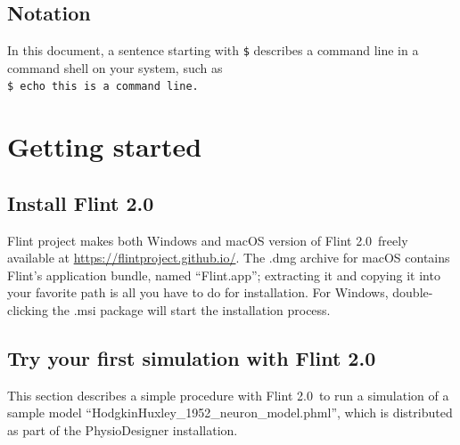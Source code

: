 \documentclass[a4paper,10pt]{report}
\def\FlintVersion{2.0}
\def\Flint{Flint \FlintVersion}
\begin{document}
\section{Notation}
In this document, a sentence starting with {\tt \$} describes a command line in
a command shell on your system, such as\\
{\tt \$ echo this is a command line.}



\chapter{Getting started}

\section{Install \Flint}
Flint project makes both Windows and macOS version of \Flint\ freely
available at \url{https://flintproject.github.io/}.
The .dmg archive for macOS contains Flint's application bundle, named
``Flint.app''; extracting it and copying it into your favorite path is all
you have to do for installation.
For Windows, double-clicking the .msi package will start the installation
process.

\section{Try your first simulation with \Flint}
This section describes a simple procedure with \Flint\ to run a simulation of a
sample model ``HodgkinHuxley\_1952\_neuron\_model.phml'', which is distributed
as part of the PhysioDesigner installation.
\end{document}
